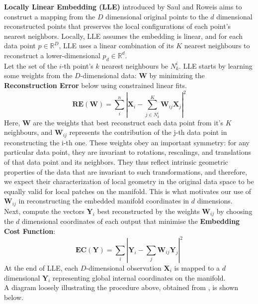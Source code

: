 \documentclass[12pt]{report}
\begin{document}
\textbf{Locally Linear Embedding (LLE)} introduced by 
Saul and Roweis \cite{lle} aims to construct 
a mapping from the $D$ dimensional 
original points to the $d$ dimensional reconstructed points
that preserves the local configurations of each point's nearest neighbors. 
Locally, LLE assumes the embedding is linear, 
and for each data point $p \in \mathbb{R}^D$, 
LLE uses a linear combination of its $K$ nearest neighbours 
to reconstruct a lower-dimensional $p_d \in \mathbb{R}^d$. \\
Let the set of the $i$-th point's $k$ nearest neighbours be $N^i_k$.
LLE starts by learning some weights from the $D$-dimensional data: 
$\mathbf{W}$ by minimizing the \textbf{Reconstruction Error} 
below using constrained linear fits.
$$\mathbf{RE}(\mathbf{W}) = \sum_i^n|\mathbf{X}_i - \sum_{j \in N^i_k}^K \mathbf{W}_{ij} \mathbf{X}_j|^2$$
Here, $\mathbf{W}$ are the weights that best reconstruct each 
data point from it's $K$ neighbours, and
$\mathbf{W}_{ij}$ represents the contribution 
of the j-th data point in reconstructing the i-th one.
These weights obey an important symmetry: for any particular data point,
they are invariant to rotations, rescalings, and translations
of that data point and its neighbors.
They thus reflect intrinsic geometric properties 
of the data that are invariant to such transformations,
and therefore, we expect their characterization of local geometry in the 
original data space to be equally valid for local patches on the manifold.
This is what motivates our use of $\mathbf{W}_{ij}$ in reconstructing
the embedded manifold coordinates in $d$ dimensions. \\
Next, compute the vectors $\mathbf{Y}_i$ best 
reconstructed by the weights $\mathbf{W}_{ij}$ 
by choosing the $d$ dimensional coordinates of each output
that minimise the \textbf{Embedding Cost Function}: 
$$\mathbf{EC}(\mathbf{Y}) = \sum_i |\mathbf{Y}_i - \sum_j \mathbf{W}_{ij}\mathbf{Y}_j|^2$$
At the end of LLE, each $D$-dimensional observation $\mathbf{X}_i$ 
is mapped to a $d$ dimensional $\mathbf{Y}_i$ 
representing global internal coordinates on the manifold.\\
A diagram loosely illustrating the procedure above, obtained from \cite{lle}, 
is shown below.
\end{document}
